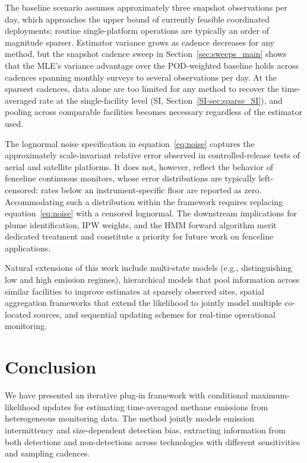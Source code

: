 \documentclass[numsec,webpdf,modern,mediumone]{oup-authoring-template}
\newcommand{\new}[1]{#1}
\begin{document}
\new{The baseline scenario assumes approximately three snapshot observations per day, which approaches the upper bound of currently feasible coordinated deployments; routine single-platform operations are typically an order of magnitude sparser. Estimator variance grows as cadence decreases for any method, but the snapshot cadence sweep in Section~\ref{sec:sweeps_main} shows that the MLE's variance advantage over the POD-weighted baseline holds across cadences spanning monthly surveys to several observations per day. At the sparsest cadences, data alone are too limited for any method to recover the time-averaged rate at the single-facility level (SI, Section~\ref{SI-sec:sparse_SI}), and pooling across comparable facilities becomes necessary regardless of the estimator used.}


\new{The lognormal noise specification in equation~\eqref{eq:noise} captures the approximately scale-invariant relative error observed in controlled-release tests of aerial and satellite platforms. It does not, however, reflect the behavior of fenceline continuous monitors, whose error distributions are typically left-censored: rates below an instrument-specific floor are reported as zero. Accommodating such a distribution within the framework requires replacing equation~\eqref{eq:noise} with a censored lognormal. The downstream implications for plume identification, IPW weights, and the HMM forward algorithm merit dedicated treatment and constitute a priority for future work on fenceline applications.}

Natural extensions of this work include multi-state models (e.g., distinguishing low and high emission regimes), hierarchical models that pool information across similar facilities to improve estimates at sparsely observed sites, spatial aggregation frameworks that extend the likelihood to jointly model multiple co-located sources, and sequential updating schemes for real-time operational monitoring.


\section{Conclusion}
\label{sec:conclusion}

We have presented an iterative plug-in framework with conditional maximum-likelihood updates for estimating time-averaged methane emissions from heterogeneous monitoring data. The method jointly models emission intermittency and size-dependent detection bias, extracting information from both detections and non-detections across technologies with different sensitivities and sampling cadences.
\end{document}
